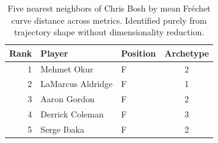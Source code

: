 \begin{table}[htbp]
  \centering\small
  \begin{tabular}{rllc}
    \toprule
    Rank & Player & Position & Archetype \\
    \midrule
    1 & Mehmet Okur & F & 2 \\
    2 & LaMarcus Aldridge & F & 1 \\
    3 & Aaron Gordon & F & 2 \\
    4 & Derrick Coleman & F & 3 \\
    5 & Serge Ibaka & F & 2 \\
    \bottomrule
  \end{tabular}
  \caption{Five nearest neighbors of Chris Bosh by mean Fr\'{e}chet curve distance across metrics. Identified purely from trajectory shape without dimensionality reduction.}
  \label{tab:Chris_Bosh_frechet_curve_neighbors}
\end{table}

